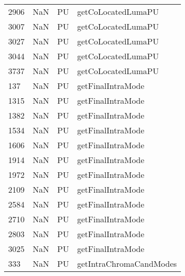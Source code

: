 \begin{tabular}{llll}
2906 &                   NaN &                         PU &                        getCoLocatedLumaPU \\
3007 &                   NaN &                         PU &                        getCoLocatedLumaPU \\
3027 &                   NaN &                         PU &                        getCoLocatedLumaPU \\
3044 &                   NaN &                         PU &                        getCoLocatedLumaPU \\
3737 &                   NaN &                         PU &                        getCoLocatedLumaPU \\
137  &                   NaN &                         PU &                         getFinalIntraMode \\
1315 &                   NaN &                         PU &                         getFinalIntraMode \\
1382 &                   NaN &                         PU &                         getFinalIntraMode \\
1534 &                   NaN &                         PU &                         getFinalIntraMode \\
1606 &                   NaN &                         PU &                         getFinalIntraMode \\
1914 &                   NaN &                         PU &                         getFinalIntraMode \\
1972 &                   NaN &                         PU &                         getFinalIntraMode \\
2109 &                   NaN &                         PU &                         getFinalIntraMode \\
2584 &                   NaN &                         PU &                         getFinalIntraMode \\
2710 &                   NaN &                         PU &                         getFinalIntraMode \\
2803 &                   NaN &                         PU &                         getFinalIntraMode \\
3025 &                   NaN &                         PU &                         getFinalIntraMode \\
333  &                   NaN &                         PU &                   getIntraChromaCandModes \\

\end{tabular}
